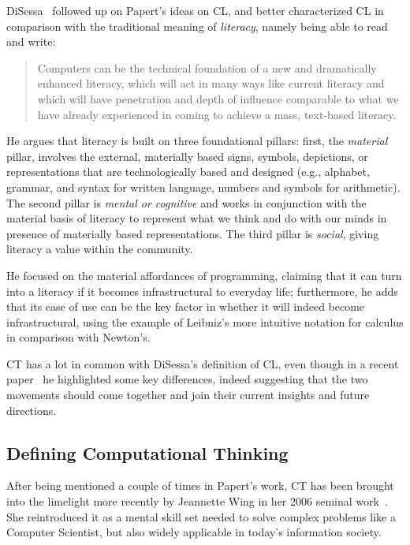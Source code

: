 DiSessa~\cite{disessa2001changing} followed up on Papert's ideas on \ac{CL}, and better characterized \ac{CL} in comparison with the traditional meaning of \emph{literacy}, namely being able to read and write:
\begin{quote}
  Computers can be the technical foundation of a new and dramatically enhanced literacy, which will act in many ways like current literacy and which will have penetration and depth of influence comparable to what we have already experienced in coming to achieve a mass, text-based literacy. 
\end{quote}

He argues that literacy is built on three foundational pillars: first, the \textit{material} pillar, involves the external, materially based signs, symbols, depictions, or representations that are technologically based and designed (e.g., alphabet, grammar, and syntax for written language, numbers and symbols for arithmetic). The second pillar is \textit{mental or cognitive} and works in conjunction with the material basis of literacy to represent what we think and do with our minds in presence of materially based representations. The third pillar is \textit{social}, giving literacy a value within the community.

He focused on the material affordances of programming, claiming that it can turn into a literacy if it becomes infrastructural to everyday life; furthermore, he adds that its ease of use can be the key factor in whether it will indeed become infrastructural, using the example of Leibniz's more intuitive notation for calculus in comparison with Newton's.

\ac{CT} has a lot in common with DiSessa's definition of \ac{CL}, even though in a recent paper~\cite{disessa2018computational} he highlighted some key differences, indeed suggesting that the two movements should come together and join their current insights and future directions.

\subsection{Defining Computational Thinking}
After being mentioned a couple of times in Papert's work, \ac{CT} has been brought into the limelight more recently by Jeannette Wing in her 2006 seminal work~\cite{Wing:2006iz}. She reintroduced it as a mental skill set needed to solve complex problems like a Computer Scientist, but also widely applicable in today's information society.

